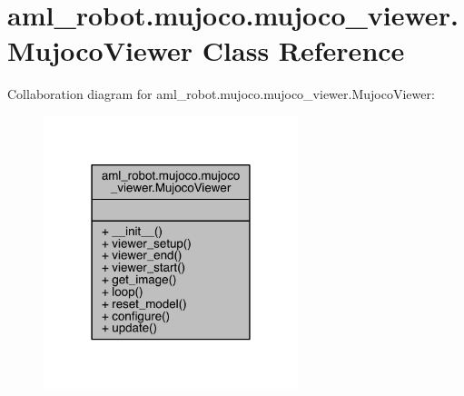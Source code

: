 \hypertarget{classaml__robot_1_1mujoco_1_1mujoco__viewer_1_1_mujoco_viewer}{}\section{aml\+\_\+robot.\+mujoco.\+mujoco\+\_\+viewer.\+Mujoco\+Viewer Class Reference}
\label{classaml__robot_1_1mujoco_1_1mujoco__viewer_1_1_mujoco_viewer}


Collaboration diagram for aml\+\_\+robot.\+mujoco.\+mujoco\+\_\+viewer.\+Mujoco\+Viewer\+:
\nopagebreak
\begin{figure}[H]
\begin{center}
\leavevmode
\includegraphics[width=210pt]{classaml__robot_1_1mujoco_1_1mujoco__viewer_1_1_mujoco_viewer__coll__graph}
\end{center}
\end{figure}
